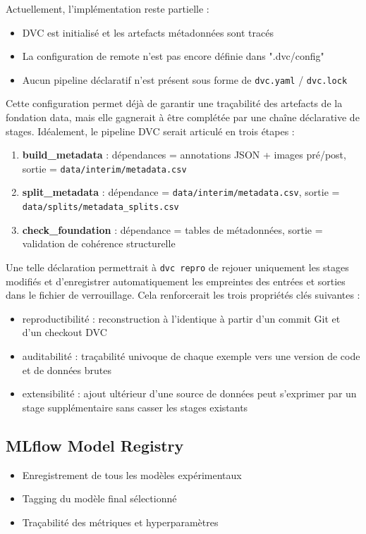 \documentclass[12pt,a4paper]{article}
\begin{document}
Actuellement, l’implémentation reste partielle :
\begin{itemize}
    \item DVC est initialisé et les artefacts métadonnées sont tracés
    \item La configuration de remote n’est pas encore définie dans ".dvc/config"
    \item Aucun pipeline déclaratif n’est présent sous forme de \texttt{dvc.yaml} / \texttt{dvc.lock}
\end{itemize}

Cette configuration permet déjà de garantir une traçabilité des artefacts de la fondation data, mais elle gagnerait à être complétée par une chaîne déclarative de stages. Idéalement, le pipeline DVC serait articulé en trois étapes :
\begin{enumerate}
    \item \textbf{build\_metadata} : dépendances = annotations JSON + images pré/post, sortie = \texttt{data/interim/metadata.csv}
    \item \textbf{split\_metadata} : dépendance = \texttt{data/interim/metadata.csv}, sortie = \texttt{data/splits/metadata\_splits.csv}
    \item \textbf{check\_foundation} : dépendance = tables de métadonnées, sortie = validation de cohérence structurelle
\end{enumerate}

Une telle déclaration permettrait à \texttt{dvc repro} de rejouer uniquement les stages modifiés et d'enregistrer automatiquement les empreintes des entrées et sorties dans le fichier de verrouillage. Cela renforcerait les trois propriétés clés suivantes :
\begin{itemize}
    \item reproductibilité : reconstruction à l'identique à partir d'un commit Git et d'un checkout DVC
    \item auditabilité : traçabilité univoque de chaque exemple vers une version de code et de données brutes
    \item extensibilité : ajout ultérieur d'une source de données peut s'exprimer par un stage supplémentaire sans casser les stages existants
\end{itemize}

\subsection{MLflow Model Registry}
\begin{itemize}
    \item Enregistrement de tous les modèles expérimentaux
    \item Tagging du modèle final sélectionné
    \item Traçabilité des métriques et hyperparamètres
\end{itemize}
\end{document}
